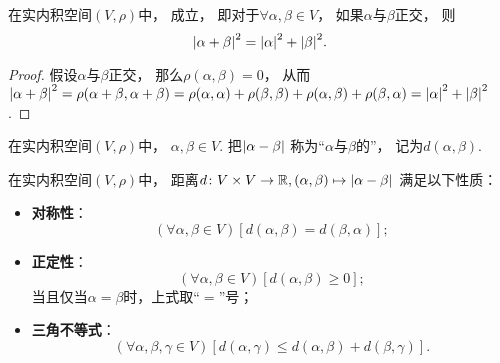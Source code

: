 \begin{corollary}\label{theorem:实内积空间.勾股定理}
在实内积空间\((V,\rho)\)中，
成立，
即对于\(\forall \alpha,\beta \in V\)，
如果\(\alpha\)与\(\beta\)正交，
则\begin{equation}
	\abs{\alpha+\beta}^2 = \abs{\alpha}^2 + \abs{\beta}^2.
\end{equation}
\begin{proof}
假设\(\alpha\)与\(\beta\)正交，
那么\(\rho(\alpha,\beta) = 0\)，
从而\(\abs{\alpha+\beta}^2
= \rho(\alpha+\beta,\alpha+\beta)
= \rho(\alpha,\alpha) + \rho(\beta,\beta) + \rho(\alpha,\beta) + \rho(\beta,\alpha)
= \abs{\alpha}^2 + \abs{\beta}^2\).
\end{proof}
\end{corollary}

\begin{definition}
在实内积空间\((V,\rho)\)中，
\(\alpha,\beta \in V\).
把\(\abs{\alpha-\beta}\)
称为“\(\alpha\)与\(\beta\)的”，
记为\(d(\alpha,\beta)\).
\end{definition}

\begin{property}
在实内积空间\((V,\rho)\)中，
距离\(d\colon V \times V \to \mathbb{R},
(\alpha,\beta) \mapsto \abs{\alpha-\beta}\)
满足以下性质：\begin{itemize}
	\item {\rm\bf 对称性}：\begin{equation*}
		(\forall \alpha,\beta \in V)
		[
			d(\alpha,\beta) = d(\beta,\alpha)
		];
	\end{equation*}

	\item {\rm\bf 正定性}：\begin{equation*}
		(\forall \alpha,\beta \in V)
		[
			d(\alpha,\beta) \geq 0
		];
	\end{equation*}
	当且仅当\(\alpha = \beta\)时，上式取“\(=\)”号；

	\item {\rm\bf 三角不等式}：\begin{equation*}
		(\forall \alpha,\beta,\gamma \in V)
		[
			d(\alpha,\gamma) \leq d(\alpha,\beta) + d(\beta,\gamma)
		].
	\end{equation*}
\end{itemize}
\end{property}

